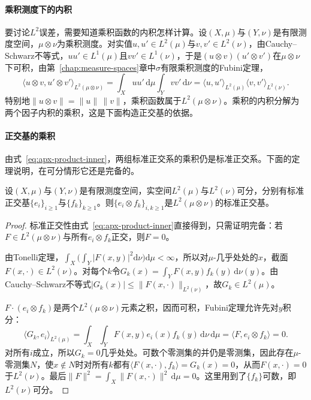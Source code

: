 \paragraph{乘积测度下的内积}

要讨论$L^2$误差，需要知道乘积函数的内积怎样计算。设$(X,\mu)$与$(Y,\nu)$是有限测度空间，$\mu\otimes\nu$为乘积测度。对实值$u,u'\in L^2(\mu)$与$v,v'\in L^2(\nu)$，由Cauchy--Schwarz不等式，$uu'\in L^1(\mu)$且$vv'\in L^1(\nu)$，于是$(u\otimes v)(u'\otimes v')$在$\mu\otimes\nu$下可积，由第~\ref{chap:measure-spaces}章中$\sigma$有限乘积测度的Fubini定理，
\begin{equation}
  \langle u\otimes v,u'\otimes v'\rangle_{L^2(\mu\otimes\nu)}
  =\int_X u u'\,\mathrm d\mu\int_Y v v'\,\mathrm d\nu
  =\langle u,u'\rangle_{L^2(\mu)}\langle v,v'\rangle_{L^2(\nu)} .
  \label{eq:apx-product-inner}
\end{equation}
特别地$\|u\otimes v\|=\|u\|\,\|v\|$，乘积函数属于$L^2(\mu\otimes\nu)$。乘积的内积分解为两个因子内积的乘积，这是下面构造正交基的依据。

\paragraph{正交基的乘积}

由式~\eqref{eq:apx-product-inner}，两组标准正交系的乘积仍是标准正交系。下面的定理说明，在可分情形它还是完备的。

\begin{theorem}[乘积正交基]
\label{thm:apx-product-basis}
设$(X,\mu)$与$(Y,\nu)$是有限测度空间，实空间$L^2(\mu)$与$L^2(\nu)$可分，分别有标准正交基$\{e_i\}_{i\ge1}$与$\{f_k\}_{k\ge1}$。则$\{e_i\otimes f_k\}_{i,k\ge1}$是$L^2(\mu\otimes\nu)$的标准正交基。
\end{theorem}

\begin{proof}
标准正交性由式~\eqref{eq:apx-product-inner}直接得到，只需证明完备：若$F\in L^2(\mu\otimes\nu)$与所有$e_i\otimes f_k$正交，则$F=0$。

由Tonelli定理，$\int_X\bigl(\int_Y|F(x,y)|^2\mathrm d\nu\bigr)\mathrm d\mu<\infty$，所以对$\mu$-几乎处处的$x$，截面$F(x,\cdot)\in L^2(\nu)$。对每个$k$令$G_k(x)=\int_YF(x,y)f_k(y)\,\mathrm d\nu(y)$。由Cauchy--Schwarz不等式$|G_k(x)|\le\|F(x,\cdot)\|_{L^2(\nu)}$，故$G_k\in L^2(\mu)$。

$F\cdot(e_i\otimes f_k)$是两个$L^2(\mu\otimes\nu)$元素之积，因而可积，Fubini定理允许先对$y$积分：
\[
  \langle G_k,e_i\rangle_{L^2(\mu)}=\int_X\!\int_YF(x,y)e_i(x)f_k(y)\,\mathrm d\nu\,\mathrm d\mu=\langle F,e_i\otimes f_k\rangle=0 .
\]
对所有$i$成立，所以$G_k=0$几乎处处。可数个零测集的并仍是零测集，因此存在$\mu$-零测集$N$，使$x\notin N$时对所有$k$都有$\langle F(x,\cdot),f_k\rangle=G_k(x)=0$，从而$F(x,\cdot)=0$于$L^2(\nu)$。最后$\|F\|^2=\int_X\|F(x,\cdot)\|^2\,\mathrm d\mu=0$。这里用到了$\{f_k\}$可数，即$L^2(\nu)$可分。
\end{proof}

